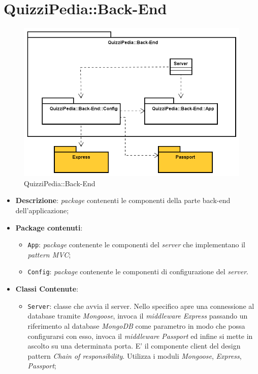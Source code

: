 \newpage
\section{QuizziPedia::Back-End}
\label{QuizziPedia::Back-End}
\begin{figure}[ht]
	\centering
	\includegraphics[scale=0.55]{UML/Package/QuizziPedia_Back-End.png}
	\caption{QuizziPedia::Back-End}
\end{figure}
\FloatBarrier
\begin{itemize}
	\item \textbf{Descrizione}:
	\textit{package} contenenti le componenti della parte back-end dell'applicazione;
	\item \textbf{Package contenuti}:
	\begin{itemize}
		\item \texttt{App}:
		\textit{package} contenente le componenti del \textit{server} che implementano il \textit{pattern MVC};
		\item \texttt{Config}:
		\textit{package} contenente le componenti di configurazione del \textit{server}.
	\end{itemize}
	\item \textbf{Classi Contenute}:
	\begin{itemize}
		\item \texttt{Server}: classe che avvia il server. Nello specifico apre una connessione al database tramite \textit{Mongoose}, invoca il \textit{middleware} \textit{Express} passando un riferimento al database \textit{MongoDB} come parametro in modo che possa configurarsi con esso, invoca il \textit{middleware} \textit{Passport} ed infine si mette in ascolto su una determinata porta. E' il componente client del design pattern \textit{Chain of responsibility}. Utilizza i moduli \textit{Mongoose}, \textit{Express}, \textit{Passport};
	\end{itemize}
\end{itemize}





	

